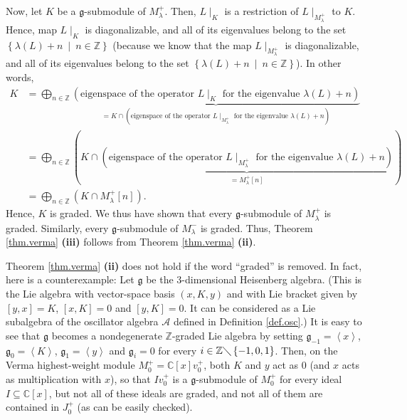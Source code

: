 \documentclass[etingof-lie.tex]{subfiles}
\begin{document}
Now, let $K$ be a $\mathfrak{g}$-submodule of $M_{\lambda}^{+}$. Then,
$L\mid_{K}$ is a restriction of $L\mid_{M_{\lambda}^{+}}$ to $K$. Hence, map
$L\mid_{K}$ is diagonalizable, and all of its eigenvalues belong to the set
$\left\{  \lambda\left(  L\right)  +n\ \mid\ n\in\mathbb{Z}\right\}  $
(because we know that the map $L\mid_{M_{\lambda}^{+}}$ is diagonalizable, and
all of its eigenvalues belong to the set $\left\{  \lambda\left(  L\right)
+n\ \mid\ n\in\mathbb{Z}\right\}  $). In other words,%
\begin{align*}
K  &  =\bigoplus\limits_{n\in\mathbb{Z}}\underbrace{\left(  \text{eigenspace
of the operator }L\mid_{K}\text{ for the eigenvalue }\lambda\left(  L\right)
+n\right)  }_{=K\cap\left(  \text{eigenspace of the operator }L\mid
_{M_{\lambda}^{+}}\text{ for the eigenvalue }\lambda\left(  L\right)
+n\right)  }\\
&  =\bigoplus\limits_{n\in\mathbb{Z}}\left(  K\cap\underbrace{\left(
\text{eigenspace of the operator }L\mid_{M_{\lambda}^{+}}\text{ for the
eigenvalue }\lambda\left(  L\right)  +n\right)  }_{=M_{\lambda}^{+}\left[
n\right]  }\right) \\
&  =\bigoplus\limits_{n\in\mathbb{Z}}\left(  K\cap M_{\lambda}^{+}\left[
n\right]  \right)  .
\end{align*}
Hence, $K$ is graded. We thus have shown that every $\mathfrak{g}$-submodule
of $M_{\lambda}^{+}$ is graded. Similarly, every $\mathfrak{g}$-submodule of
$M_{\lambda}^{-}$ is graded. Thus, Theorem \ref{thm.verma} \textbf{(iii)}
follows from Theorem \ref{thm.verma} \textbf{(ii)}.

\begin{remark}
Theorem \ref{thm.verma} \textbf{(ii)} does not hold if the word ``graded'' is
removed. In fact, here is a counterexample: Let $\mathfrak{g}$ be the
3-dimensional Heisenberg algebra. (This is the Lie algebra with vector-space
basis $\left(  x,K,y\right)  $ and with Lie bracket given by $\left[
y,x\right]  =K$, $\left[  x,K\right]  =0$ and $\left[  y,K\right]  =0$. It can
be considered as a Lie subalgebra of the oscillator algebra $\mathcal{A}$
defined in Definition \ref{def.osc}.) It is easy to see that $\mathfrak{g}$
becomes a nondegenerate $\mathbb{Z}$-graded Lie algebra by setting
$\mathfrak{g}_{-1}=\left\langle x\right\rangle $, $\mathfrak{g}_{0}%
=\left\langle K\right\rangle $, $\mathfrak{g}_{1}=\left\langle y\right\rangle
$ and $\mathfrak{g}_{i}=0$ for every $i\in\mathbb{Z}\diagdown\left\{
-1,0,1\right\}  $. Then, on the Verma highest-weight module $M_{0}%
^{+}=\mathbb{C}\left[  x\right]  v_{0}^{+}$, both $K$ and $y$ act as $0$ (and
$x$ acts as multiplication with $x$), so that $Iv_{0}^{+}$ is a $\mathfrak{g}%
$-submodule of $M_{0}^{+}$ for every ideal $I\subseteq\mathbb{C}\left[
x\right]  $, but not all of these ideals are graded, and not all of them are
contained in $J_{0}^{+}$ (as can be easily checked).
\end{remark}
\end{document}
